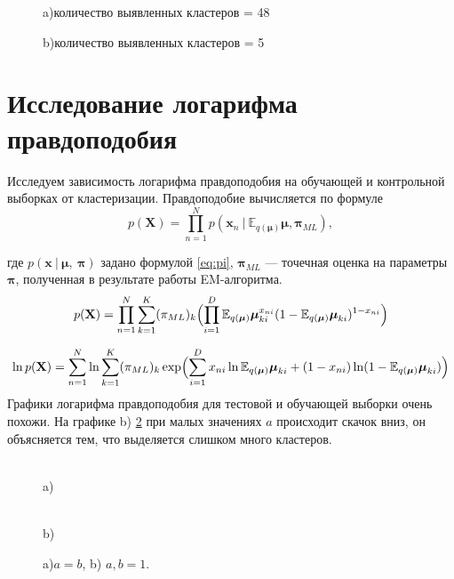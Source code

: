 \documentclass[twoside]{article}
\begin{document}
\begin{figure}[h!]
	\begin{center}		
	\begin{minipage}[h]{\linewidth}
		\caption{a)количество выявленных кластеров = 48}
	\end{minipage}
	\vfill
	\begin{minipage}[h]{0.48\linewidth}
		\caption{b)количество выявленных кластеров = 5}
	\end{minipage}
	\label{fig:2}
	\end{center}
\end{figure}

\section{Исследование логарифма правдоподобия}
Исследуем зависимость логарифма правдоподобия на обучающей и контрольной выборках от кластеризации. Правдоподобие вычисляется по формуле
\[p(\textbf{X}) = \prod_{n=1}^N p(\textbf{x}_n\: | \: \mathbb{E}_{q(\boldsymbol{\mu})} \boldsymbol{\mu},\boldsymbol{\pi}_{ML}), \]

где $p(\textbf{x}\:|\:\boldsymbol{\mu},\:\boldsymbol{\pi})$	 задано формулой \ref{eq:pi}, $\boldsymbol{\pi}_{ML}$ — точечная оценка на параметры $\boldsymbol\pi$, полученная в результате работы EM-алгоритма.
\[p(\textbf{X}) = \prod_{n=1}^N \sum_{k=1}^K (\pi_{ML})_k \Bigl( \prod_{i=1}^D\mathbb{E}_{q(\boldsymbol{\mu})} \boldsymbol{\mu}_{ki}^{x_{ni}} (1 - \mathbb{E}_{q(\boldsymbol{\mu})} \boldsymbol{\mu}_{ki})^{1 - x_{ni}}\Bigr) \]

\[\ln p(\textbf{X}) = \sum_{n=1}^N \ln \sum_{k=1}^K (\pi_{ML})_k \exp\Bigl( \sum_{i=1}^D {x_{ni}} \ln \mathbb{E}_{q(\boldsymbol{\mu})} \boldsymbol{\mu}_{ki}  + 	(1 - x_{ni}) \ln (1 - \mathbb{E}_{q(\boldsymbol{\mu})} \boldsymbol{\mu}_{ki})\Bigr) \]
Графики логарифма правдоподобия для тестовой и обучающей выборки очень похожи. На графике b) \ref{fig:6} при малых значениях $a$  происходит скачок вниз, он объясняется  тем, что выделяется слишком много кластеров.


\begin{figure}[h!]
	\begin{minipage}[h]{0.49\linewidth}
		 \\a) 
	\end{minipage}
	\hfill
	\begin{minipage}[h]{0.49\linewidth}
		 \\b)
	\end{minipage}
	\caption{a)$ a = b $, b) $a, b = 1$.}
	\label{fig:6}
\end{figure}
\end{document}
